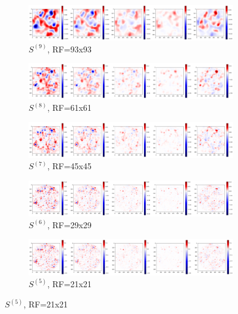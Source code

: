 \documentclass[preprint]{elsarticle}
\theoremstyle{definition} %
\theoremstyle{remark}
\begin{document}
\begin{figure}[h!]
	\centering
	\begin{subfigure}[b]{\textwidth}
		\includegraphics[width=\textwidth]{figures/score-prop-23713_left/score_rf93.png}
		\caption{$S^{(9)}$, RF=93x93}
		\label{fig:score_rf93}
	\end{subfigure}
	
	\begin{subfigure}[b]{\textwidth}
		\includegraphics[width=\textwidth]{figures/score-prop-23713_left/score_rf61.png}
		\caption{$S^{(8)}$, RF=61x61}
		\label{fig:score_rf61}
	\end{subfigure}
	
	\begin{subfigure}[b]{\textwidth}
		\includegraphics[width=\textwidth]{figures/score-prop-23713_left/score_rf45.png}
		\caption{$S^{(7)}$, RF=45x45}
		\label{fig:score_rf45}
	\end{subfigure}
	
	\begin{subfigure}[b]{\textwidth}
		\includegraphics[width=\textwidth]{figures/score-prop-23713_left/score_rf29.png}
		\caption{$S^{(6)}$, RF=29x29}
		\label{fig:score_rf29}
	\end{subfigure}
	
	\begin{subfigure}[b]{\textwidth}
		\includegraphics[width=\textwidth]{figures/score-prop-23713_left/score_rf21.png}
		\caption{$S^{(5)}$, RF=21x21}
		\label{fig:score_rf21}
	\end{subfigure}
	

\end{figure}
\end{document}
